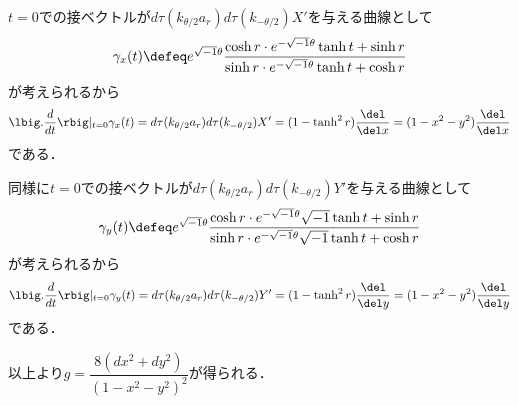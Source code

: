 \begin{npfwn}
  $t = 0$での接ベクトルが$d\tau(k_{\theta/2}a_r)d\tau(k_{-\theta/2})X'$を与える曲線として
  \begin{align*}
    \gamma_x(t) \defeq  e^{\sqrt{-1} \theta}\dfrac{\cosh r\cdot e^{-\sqrt{-1}\theta} \tanh t + \sinh r }{\sinh r\cdot e^{-\sqrt{-1}\theta} \tanh t + \cosh r}
  \end{align*}
  が考えられるから
  \begin{align*}
    \lbig.\dfrac{d}{dt}\rbig|_{t=0}\gamma_x(t) = d\tau(k_{\theta/2}a_r)d\tau(k_{-\theta/2})X' = (1 - \tanh^2 r)\dfrac{\del}{\del x} = (1-x^2-y^2)\dfrac{\del}{\del x}
  \end{align*}
  である．

  同様に$t = 0$での接ベクトルが$d\tau(k_{\theta/2}a_r)d\tau(k_{-\theta/2})Y'$を与える曲線として
  \begin{align*}
    \gamma_y(t) \defeq  e^{\sqrt{-1} \theta}\dfrac{\cosh r\cdot e^{-\sqrt{-1}\theta}\sqrt{-1} \tanh t + \sinh r }{\sinh r\cdot e^{-\sqrt{-1}\theta}\sqrt{-1} \tanh t + \cosh r}
  \end{align*}
  が考えられるから
  \begin{align*}
    \lbig.\dfrac{d}{dt}\rbig|_{t=0}\gamma_y(t) = d\tau(k_{\theta/2}a_r)d\tau(k_{-\theta/2})Y' = (1 - \tanh^2 r)\dfrac{\del}{\del y} = (1-x^2-y^2)\dfrac{\del}{\del y}
  \end{align*}
  である．

  以上より$g  =  \dfrac{8(dx^2 + dy^2)}{(1 - x^2 - y^2)^2} $が得られる．
\end{npfwn}


